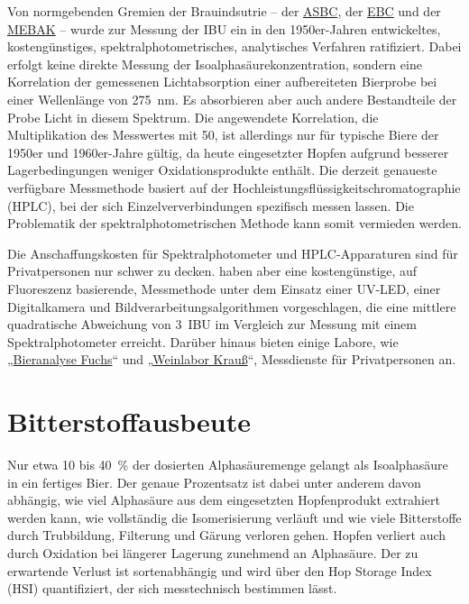 \documentclass[a4paper,parskip=half]{scrartcl}
\begin{document}
Von normgebenden Gremien der Brauindsutrie – der \href{https://www.asbcnet.org}{ASBC}, der \href{https://europeanbreweryconvention.eu}{EBC} und der \href{https://www.mebak.org}{MEBAK} – wurde zur Messung der IBU ein in den 1950er-Jahren entwickeltes, kostengünstiges, spektralphotometrisches, analytisches Verfahren ratifiziert. Dabei erfolgt keine direkte Messung der Isoalphasäurekonzentration, sondern eine Korrelation der gemessenen Lichtabsorption einer aufbereiteten Bierprobe bei einer Wellenlänge von 275~nm. Es absorbieren aber auch andere Bestandteile der Probe Licht in diesem Spektrum. Die angewendete Korrelation, die Multiplikation des Messwertes mit 50, ist allerdings nur für typische Biere der 1950er und 1960er-Jahre gültig, da heute eingesetzter Hopfen aufgrund besserer Lagerbedingungen weniger Oxidationsprodukte enthält. Die derzeit genaueste
verfügbare Messmethode basiert auf der Hochleistungsflüssigkeitschromatographie (HPLC),
bei der sich Einzelververbindungen spezifisch messen lassen. Die Problematik der spektralphotometrischen Methode kann somit vermieden werden. \parencites{ASBC2011}{Hosom2017}[28]{Nottebohm2020}

Die Anschaffungskosten für Spektralphotometer und HPLC-Apparaturen sind für Privatpersonen nur schwer zu decken. \textcite{Calado2019} haben aber eine kostengünstige, auf Fluoreszenz basierende, Messmethode unter dem Einsatz einer UV-LED, einer Digitalkamera und Bildverarbeitungsalgorithmen vorgeschlagen, die eine mittlere quadratische Abweichung von 3~IBU im Vergleich zur Messung mit einem Spektralphotometer erreicht. Darüber hinaus bieten einige Labore, wie „\href{https://bieranalyse.de}{Bieranalyse Fuchs}“ und „\href{https://www.weinlabor-krauss.de}{Weinlabor Krauß}“, Messdienste für Privatpersonen an.

\section*{Bitterstoffausbeute}

Nur etwa 10 bis 40~\% der dosierten Alphasäuremenge gelangt als Isoalphasäure in ein fertiges Bier. Der genaue Prozentsatz ist dabei unter anderem davon abhängig, wie viel Alphasäure aus dem eingesetzten Hopfenprodukt extrahiert werden kann, wie vollständig die Isomerisierung verläuft und wie viele Bitterstoffe durch Trubbildung, Filterung und Gärung verloren gehen. Hopfen verliert auch durch Oxidation bei längerer Lagerung zunehmend an Alphasäure. Der zu erwartende Verlust ist sortenabhängig und wird über den Hop Storage Index (HSI) quantifiziert, der sich messtechnisch bestimmen lässt. \parencites[9]{Malowicki2005}[103\psq]{Garetz1994} 
\end{document}
